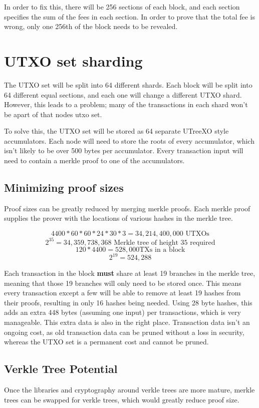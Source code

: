 \documentclass[12pt, letterpaper]{article}
\begin{document}
In order to fix this, there will be 256 sections of each block, and each section
specifies the sum of the fees in each section. In order to prove that the total
fee is wrong, only one 256th of the block needs to be revealed.

\section{UTXO set sharding}
The UTXO set will be split into 64 different shards. Each block will be split
into 64 different equal sections, and each one will change a different UTXO
shard. However, this leads to a problem; many of the transactions in each shard
won't be apart of that nodes utxo set.

To solve this, the UTXO set will be stored as 64 separate UTreeXO \cite{UTreeXO}
style accumulators. Each node will need to store the roots of every accumulator,
which isn't likely to be over 500 bytes per accumulator. Every transaction input
will need to contain a merkle proof to one of the accumulators.

\subsection{Minimizing proof sizes}
Proof sizes can be greatly reduced by merging merkle proofs. Each merkle proof
supplies the prover with the locations of various hashes in the merkle tree.

\[ 4400 * 60 * 60 * 24 * 30 * 3 = 34,214,400,000 \textrm{ UTXOs} \]
\[ 2^{35} = 34,359,738,368 \textrm{ Merkle tree of height 35 required} \]
\[ 120 * 4400 = 528,000 \textrm{TXs in a block} \]
\[ 2^{19} = 524,288 \]

Each transaction in the block \textbf{must} share at least 19 branches in the
merkle tree, meaning that those 19 branches will only need to be stored once.
This means every transaction except a few will be able to remove at least 19
hashes from their proofs, resulting in only 16 hashes being needed. Using 28
byte hashes, this adds an extra 448 bytes (assuming one input) per transactions,
which is very manageable. This extra data is also in the right place.
Transaction data isn't an ongoing cost, as old transaction data can be pruned
without a loss in security, whereas the UTXO set is a permanent cost and cannot
be pruned.

\subsection{Verkle Tree Potential}
Once the libraries and cryptography around verkle trees are more mature, merkle
trees can be swapped for verkle trees, which would greatly reduce proof size.
\end{document}
